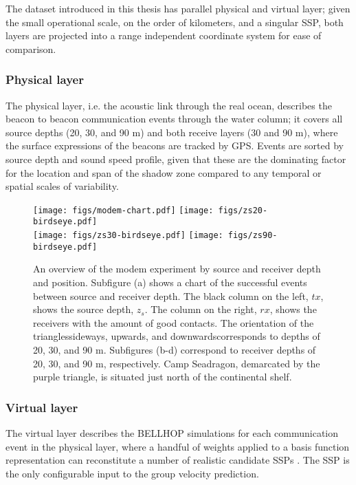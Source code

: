 The dataset introduced in this thesis has parallel physical and virtual layer; given the small operational scale, on the order of kilometers, and a singular SSP, both layers are projected into a range independent coordinate system for ease of comparison.

\subsubsection{Physical layer}
The physical layer, i.e. the acoustic link through the real ocean, describes the beacon to beacon communication events through the water column; it covers all source depths (20, 30, and 90 m) and both receive layers (30 and 90 m), where the surface expressions of the beacons are tracked by GPS. Events are sorted by source depth and sound speed profile, given that these are the dominating factor for the location and span of the shadow zone compared to any temporal or spatial scales of variability.


\begin{figure}[h!]
  \centering
  \texttt{[image: figs/modem-chart.pdf]} \hfill
  \texttt{[image: figs/zs20-birdseye.pdf]} \\
  \vspace{1em}
  \texttt{[image: figs/zs30-birdseye.pdf]} \hfill
  \texttt{[image: figs/zs90-birdseye.pdf]} \\
  \caption{An overview of the modem experiment by source and receiver depth and position. Subfigure (a) shows a chart of the successful events between source and receiver depth. The black column on the left, $tx$, shows the source depth, $z_s$. The column on the right, $rx$, shows the receivers with the amount of good contacts. The orientation of the triangles\textemdash sideways, upwards, and downwards\textemdash corresponds to depths of 20, 30, and 90 m. Subfigures (b-d) correspond to receiver depths of 20, 30, and 90 m, respectively. Camp Seadragon, demarcated by the purple triangle, is situated just north of the continental shelf.}
  \label{fig:overview}
  \end{figure}

\clearpage

\subsubsection{Virtual layer}
The virtual layer describes the BELLHOP simulations for each communication event in the physical layer, where a handful of weights applied to a basis function representation can reconstitute a number of realistic candidate SSPs \citep{leblanc_underwater_1980,lin_merging_2010}.
The SSP is the only configurable input to the group velocity prediction.

